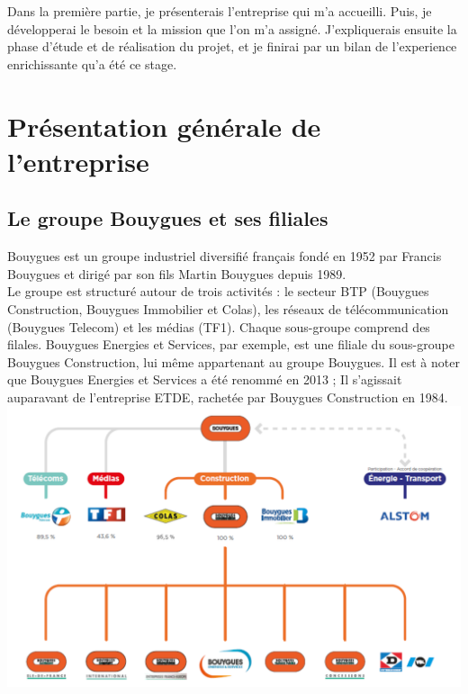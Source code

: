 \documentclass[a4paper]{article}
\begin{document}
    Dans la première partie, je présenterais l'entreprise qui m'a accueilli. Puis, je développerai le besoin et la mission que l'on m'a assigné. J'expliquerais ensuite la phase d'étude et de réalisation du projet, et je finirai par un bilan de l'experience enrichissante qu'a été ce stage. \\

    \newpage 
    \section{Présentation générale de l'entreprise}

    \subsection{Le groupe Bouygues et ses filiales}

    Bouygues est un groupe industriel diversifié français fondé en 1952 par Francis Bouygues et dirigé par son fils Martin Bouygues depuis 1989. \\

    Le groupe est structuré autour de trois activités : le secteur BTP (Bouygues Construction,
Bouygues Immobilier et Colas), les réseaux de télécommunication (Bouygues Telecom) et les médias (TF1). Chaque sous-groupe comprend des filales. Bouygues Energies et Services, par exemple, est une filiale du sous-groupe Bouygues Construction, lui même appartenant au groupe Bouygues. Il est à noter que Bouygues Energies et Services a été renommé en 2013 ; Il s'agissait auparavant de l'entreprise ETDE, rachetée par Bouygues Construction en 1984. \\

    \includegraphics[scale=0.45]{img/groupeBouygues}
    
\end{document}
